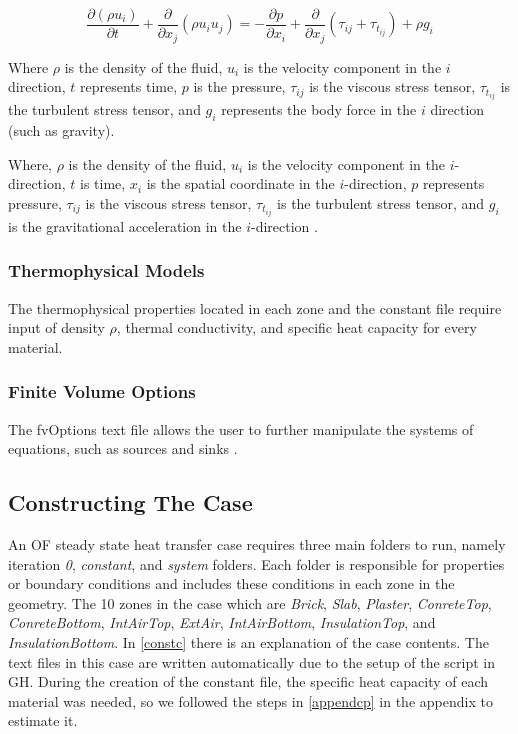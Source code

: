 \begin{equation}
\frac{\partial (\rho u_i)}{\partial t} + \frac{\partial}{\partial x_j} \left( \rho u_i u_j \right) = -\frac{\partial p}{\partial x_i} + \frac{\partial}{\partial x_j} \left( \tau_{ij} + \tau_{t_{ij}} \right) + \rho g_i
\end{equation}

Where \(\rho\) is the density of the fluid, \(u_i\) is the velocity component in the \(i\) direction, \(t\) represents time, \(p\) is the pressure, \(\tau_{ij}\) is the viscous stress tensor, \(\tau_{t_{ij}}\) is the turbulent stress tensor, and \(g_i\) represents the body force in the \(i\) direction (such as gravity).


Where, $\rho$ is the density of the fluid, $u_i$ is the velocity component in the $i$-direction, $t$ is time, $x_i$ is the spatial coordinate in the $i$-direction, $p$ represents pressure, $\tau_{ij}$ is the viscous stress tensor, $\tau_{t_{ij}}$ is the turbulent stress tensor, and $g_i$ is the gravitational acceleration in the $i$-direction
 \cite{cht}.


\subsubsection{Thermophysical Models}
The thermophysical properties located in each zone and the constant file require input of density $\rho$, thermal conductivity, and specific heat capacity for every material.
\subsubsection{Finite Volume Options}
The fvOptions text file allows the user to further manipulate the systems of equations, such as sources and sinks \cite{ofvoptions}.  


\subsection{Constructing The Case}    
An \gls{OF} steady state heat transfer case requires three main folders to run, namely iteration \textit{0}, \textit{constant}, and \textit{system} folders. Each folder is responsible for properties or boundary conditions and includes these conditions in each zone in the geometry. The 10 zones in the case which are \textit{Brick}, \textit{Slab}, \textit{Plaster}, \textit{ConreteTop}, \textit{ConreteBottom}, \textit{IntAirTop}, \textit{ExtAir}, \textit{IntAirBottom}, \textit{InsulationTop}, and \textit{InsulationBottom}. In \cref{constc} there is an explanation of the case contents. The text files in this case are written automatically due to the setup of the script in \gls{GH}. During the creation of the constant file, the specific heat capacity of each material was needed, so we followed the steps in \ref{appendcp} in the appendix to estimate it.






